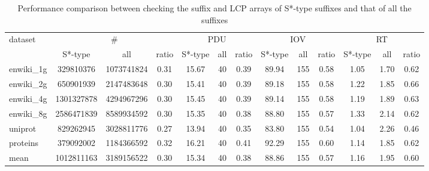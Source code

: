 \documentclass[10pt,journal,compsoc]{IEEEtran}
\begin{document}
	
	
\renewcommand\arraystretch{1.3}
\begin{table}[!t]
	\caption{Performance comparison between checking the suffix and LCP arrays of S*-type suffixes and that of all the suffixes}
	\label{tbl:2}
	\centering
	\begin{tabular}{|l|c|c|c|c|c|c|c|c|c|c|c|c|}
		\hline
		\multirow{2}{*}{dataset} & \multicolumn{3}{|c|}{\#} & \multicolumn{3}{|c|}{PDU} & \multicolumn{3}{|c|}{IOV} & \multicolumn{3}{|c|}{RT} \\\cline{2-13}
						 & S*-type & all & ratio & S*-type & all & ratio & S*-type & all & ratio & S*-type & all & ratio \\\hline
		enwiki\_1g & 329810376 & 1073741824 & 0.31 & 15.67 & 40 & 0.39 & 89.94 & 155 & 0.58 & 1.05 & 1.70 & 0.62 \\\hline
		enwiki\_2g & 650901939 & 2147483648 & 0.30 & 15.41 & 40 & 0.39 & 89.18 & 155 & 0.58 & 1.22 & 1.85 & 0.66 \\\hline
		enwiki\_4g & 1301327878 & 4294967296 & 0.30 & 15.45 & 40 & 0.39 & 89.14 & 155 & 0.58 & 1.19 & 1.89 & 0.63 \\\hline
		enwiki\_8g & 2586471839 & 8589934592 & 0.30 & 15.35 & 40 & 0.38 & 88.80 & 155 & 0.57 & 1.33 & 2.14 & 0.62 \\\hline	
		uniprot & 829262945 & 3028811776 & 0.27 & 13.94 & 40 & 0.35 & 83.80 & 155 & 0.54 & 1.04 & 2.26 & 0.46 \\\hline
		proteins & 379092002 & 1184366592 & 0.32 & 16.21 & 40 & 0.41 & 92.29 & 155 & 0.60 & 1.14 & 1.85 & 0.62	\\\hline
		mean & 1012811163 & 3189156522 & 0.30 & 15.34 & 40 & 0.38 & 88.86 & 155 & 0.57 & 1.16 & 1.95 & 0.60 \\\hline
	\end{tabular}
\end{table}

\end{document}
